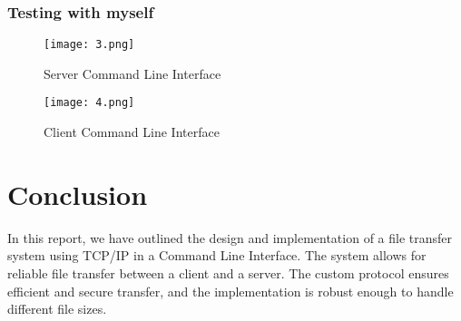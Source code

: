 \documentclass[a4paper,12pt]{article}
\begin{document}
\subsubsection{Testing with myself}
\begin{figure}[h]
    \centering
    \texttt{[image: 3.png]}
    \caption{Server Command Line Interface}
    \label{fig:server_command_line_interface}
\end{figure}

\begin{figure}[h]  
    \centering
    \texttt{[image: 4.png]}
    \caption{Client Command Line Interface}
    \label{fig:client_command_line_interface}
\end{figure}

\section{Conclusion}
In this report, we have outlined the design and implementation of a file transfer system using TCP/IP in a Command Line Interface. The system allows for reliable file transfer between a client and a server. The custom protocol ensures efficient and secure transfer, and the implementation is robust enough to handle different file sizes.
\end{document}
